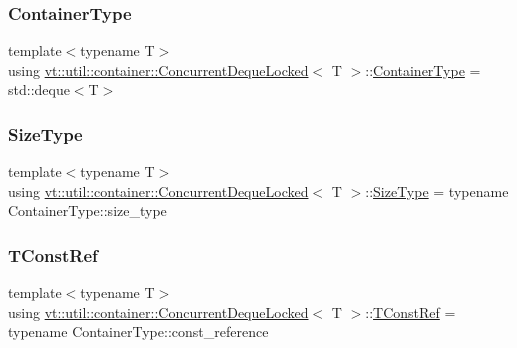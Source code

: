 \subsubsection{\texorpdfstring{Container\+Type}{ContainerType}}
{\footnotesize\ttfamily template$<$typename T$>$ \\
using \hyperlink{structvt_1_1util_1_1container_1_1_concurrent_deque_locked}{vt\+::util\+::container\+::\+Concurrent\+Deque\+Locked}$<$ T $>$\+::\hyperlink{structvt_1_1util_1_1container_1_1_concurrent_deque_locked_ab8d922cda54539b322830391268284bb}{Container\+Type} =  std\+::deque$<$T$>$}

\mbox{\label{structvt_1_1util_1_1container_1_1_concurrent_deque_locked_a6f35f4923f1329d25378656b0582e916}} 
\subsubsection{\texorpdfstring{Size\+Type}{SizeType}}
{\footnotesize\ttfamily template$<$typename T$>$ \\
using \hyperlink{structvt_1_1util_1_1container_1_1_concurrent_deque_locked}{vt\+::util\+::container\+::\+Concurrent\+Deque\+Locked}$<$ T $>$\+::\hyperlink{structvt_1_1util_1_1container_1_1_concurrent_deque_locked_a6f35f4923f1329d25378656b0582e916}{Size\+Type} =  typename Container\+Type\+::size\+\_\+type}

\mbox{\label{structvt_1_1util_1_1container_1_1_concurrent_deque_locked_a9da9776dff836c013a95431f3ab15e35}} 
\subsubsection{\texorpdfstring{T\+Const\+Ref}{TConstRef}}
{\footnotesize\ttfamily template$<$typename T$>$ \\
using \hyperlink{structvt_1_1util_1_1container_1_1_concurrent_deque_locked}{vt\+::util\+::container\+::\+Concurrent\+Deque\+Locked}$<$ T $>$\+::\hyperlink{structvt_1_1util_1_1container_1_1_concurrent_deque_locked_a9da9776dff836c013a95431f3ab15e35}{T\+Const\+Ref} =  typename Container\+Type\+::const\+\_\+reference}


